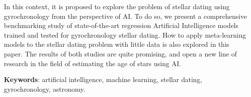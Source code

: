 In this context, it is proposed to explore the problem of stellar dating using gyrochronology from the perspective of AI. To do so, we present a comprehensive benchmarking study of state-of-the-art regression Artificial Intelligence models trained and tested for gyrochronology stellar dating. How to apply meta-learning models to the stellar dating problem with little data is also explored in this paper. The results of both studies are quite promising, and open a new line of research in the field of estimating the age of stars using AI.

\vspace{1cm}

\textbf{Keywords}: artificial intelligence, machine learning, stellar dating, gyrochronology, astronomy.


\newpage
\thispagestyle{empty}
\hspace*{0.5cm}
\newpage
